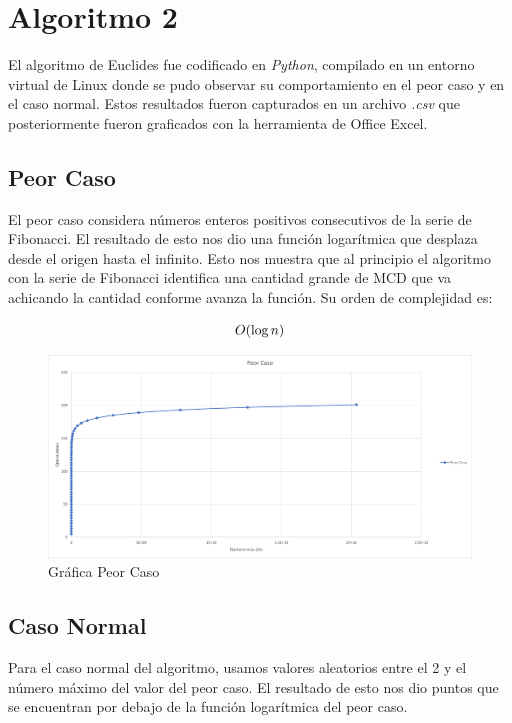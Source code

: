     \newpage
    \section{Algoritmo 2}
        El algoritmo de Euclides fue codificado en \textit{Python}, compilado en un entorno virtual de Linux donde se pudo observar su comportamiento en el peor caso y en el caso normal. Estos resultados fueron capturados en un archivo \textit{.csv} que posteriormente fueron graficados con la herramienta de Office Excel. 
    
    \subsection{Peor Caso}
        El peor caso considera números enteros positivos consecutivos de la serie de Fibonacci. El resultado de esto nos dio una función logarítmica que desplaza desde el origen hasta el infinito. Esto nos muestra que al principio el algoritmo con la serie de Fibonacci identifica una cantidad grande de MCD que va achicando la cantidad conforme avanza la función.
        Su orden de complejidad es:
        
        \[\Large{O}(\log n) \]
        
        \begin{figure}[htp!]
            \centering
            \includegraphics[width=1 \textwidth]{Images/Graf_PeorCaso2.png}  
            \caption{Gráfica Peor Caso}
            \label{fig:my_label}
        \end{figure}
    
    \newpage
    \subsection{Caso Normal}
        Para el caso normal del algoritmo, usamos valores aleatorios entre el 2 y el número máximo del valor del peor caso. El resultado de esto nos dio puntos que se encuentran por debajo de la función logarítmica del peor caso. 
        
